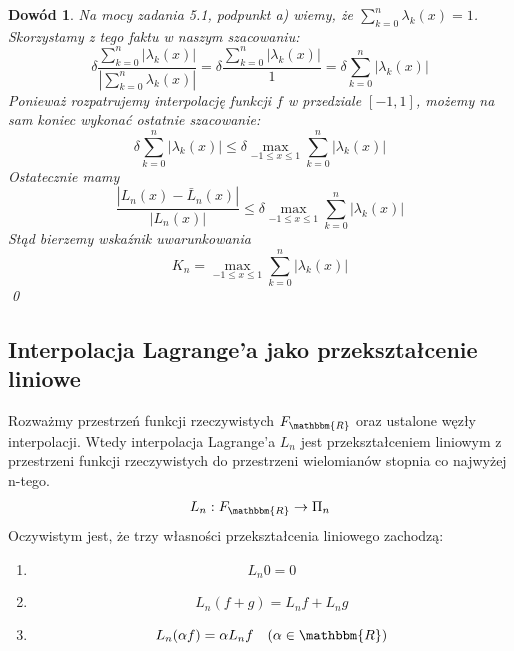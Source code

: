\documentclass{article}
\newtheorem*{dd}{Dowód}
\begin{document}
\begin{dd}
Na mocy zadania 5.1, podpunkt a) wiemy, że $\sum_{k = 0}^n \lambda_k(x) = 1$. Skorzystamy z tego faktu w naszym szacowaniu:
\begin{equation*}
\delta \frac{\sum_{k = 0}^n |\lambda_k(x)|}{|\sum_{k = 0}^n \lambda_k(x)|} = \delta \frac{\sum_{k = 0}^n |\lambda_k(x)|}{1} = \delta \sum_{k = 0}^n |\lambda_k(x)|
\end{equation*}
Ponieważ rozpatrujemy interpolację funkcji $f$ w przedziale $[-1, 1]$, możemy na sam koniec wykonać ostatnie szacowanie:
\begin{equation*}
\delta \sum_{k = 0}^n |\lambda_k(x)| \leq \delta \max_{-1 \leq x \leq 1}  \sum_{k = 0}^n |\lambda_k(x)|
\end{equation*}
Ostatecznie mamy
\begin{equation*}
\frac{|L_n(x) - \bar{L}_n(x)|}{|L_n(x)|} \leq \delta \max_{-1 \leq x \leq 1}  \sum_{k = 0}^n |\lambda_k(x)|
\end{equation*}
Stąd bierzemy wskaźnik uwarunkowania
\begin{equation*}
K_n = \max_{-1 \leq x \leq 1}  \sum_{k = 0}^n |\lambda_k(x)|
\end{equation*}
\qed
\end{dd}

\subsection{Interpolacja Lagrange'a jako przekształcenie liniowe}
Rozważmy przestrzeń funkcji rzeczywistych $F_{\mathbbm{R}}$ oraz ustalone węzły interpolacji. Wtedy interpolacja Lagrange'a $L_n$ jest przekształceniem liniowym z przestrzeni funkcji rzeczywistych do przestrzeni wielomianów stopnia co najwyżej n-tego.
\begin{equation*}
L_n : F_{\mathbbm{R}} \to \Pi_n
\end{equation*}
Oczywistym jest, że trzy własności przekształcenia liniowego zachodzą:
\begin{enumerate}
\item 
\begin{equation*}
L_n 0 = 0
\end{equation*}
\item 
\begin{equation*}
L_n (f+g) = L_n f + L_n g
\end{equation*}
\item 
\begin{equation*}
L_n (\alpha f) = \alpha L_n f \quad (\alpha \in \mathbbm{R})
\end{equation*}

\end{enumerate}
\end{document}
